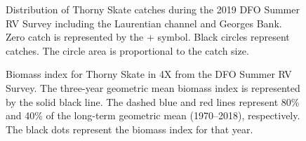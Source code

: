 \documentclass[11pt]{book}
\begin{document}
\begin{figure}[htb]

{\centering {} 

}

\caption{Distribution of Thorny Skate catches during the 2019 DFO Summer RV Survey including the Laurentian channel and Georges Bank. Zero catch is represented by the + symbol. Black circles represent catches. The circle area is proportional to the catch size.}\label{fig:85-map-thornyskate}
\end{figure}

\begin{figure}[htb]

{\centering {} 

}

\caption{Biomass index for Thorny Skate in 4X from the DFO Summer RV Survey. The three-year geometric mean biomass index is represented by the solid black line. The dashed blue and red lines represent 80\% and 40\% of the long-term geometric mean (1970--2018), respectively. The black dots represent the biomass index for that year.}\label{fig:86-fig-thornyskate-biomass4X}
\end{figure}
\end{document}
